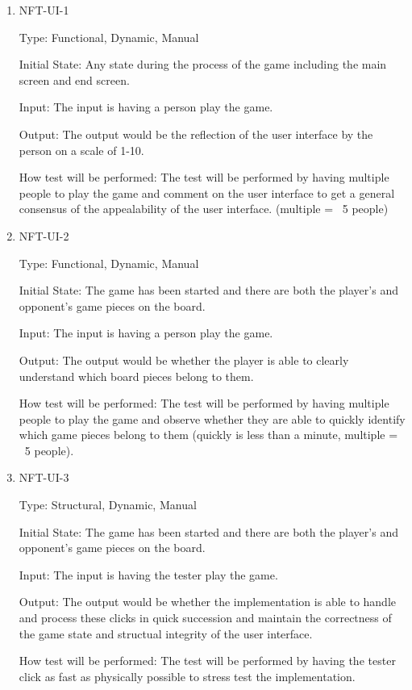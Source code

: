 \documentclass[12pt, titlepage]{article}
\begin{document}
\begin{enumerate}
	\item NFT-UI-1

	      Type: Functional, Dynamic, Manual

	      Initial State: Any state during the process of the game including the main screen and end screen.

	      Input: The input is having a person play the game.

	      Output: The output would be the reflection of the user interface by the person on a scale of 1-10.

	      How test will be performed: The test will be performed by having multiple people to play the game and comment on the user interface to get a general consensus of the appealability of the user interface. (multiple = ~5 people)

	\item NFT-UI-2

	      Type: Functional, Dynamic, Manual

	      Initial State: The game has been started and there are both the player's and opponent's game pieces on the board.

	      Input: The input is having a person play the game.

	      Output: The output would be whether the player is able to clearly understand which board pieces belong to them.

	      How test will be performed: The test will be performed by having multiple people to play the game and observe whether they are able to quickly identify which game pieces belong to them (quickly is less than a minute, multiple = ~5 people).

	\item NFT-UI-3

	      Type: Structural, Dynamic, Manual

	      Initial State: The game has been started and there are both the player's and opponent's game pieces on the board.

	      Input: The input is having the tester play the game.

	      Output: The output would be whether the implementation is able to handle and process these clicks in quick succession and maintain the correctness of the game state and structual integrity of the user interface.

	      How test will be performed: The test will be performed by having the tester click as fast as physically possible to stress test the implementation.

\end{enumerate}
\end{document}

